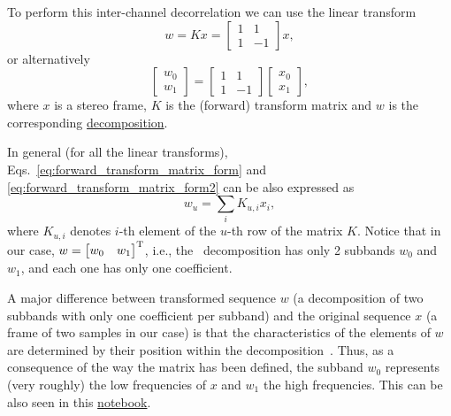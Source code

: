 To perform this inter-channel decorrelation we can use the linear transform
\begin{equation}
  w = Kx = \begin{bmatrix} 1 & 1 \\ 1 & -1 \end{bmatrix}x,
  \label{eq:forward_transform_matrix_form}
\end{equation}
or alternatively
\begin{equation}
  \begin{bmatrix}
    w_0 \\
    w_1
  \end{bmatrix}
  = 
  \begin{bmatrix} 1 & 1 \\ 1 & -1 \end{bmatrix}
  \begin{bmatrix}
    x_0 \\
    x_1
  \end{bmatrix},
  \label{eq:forward_transform_matrix_form2}
\end{equation}
where $x$ is a stereo frame, $K$ is the (forward) transform matrix and
$w$ is the
corresponding \href{https://en.wikipedia.org/wiki/Discrete_wavelet_transform#Example_in_image_processing}{decomposition}.


In general (for all the linear transforms), Eqs.~\ref{eq:forward_transform_matrix_form}
and \ref{eq:forward_transform_matrix_form2} can be also expressed as
\begin{equation}
  w_u = \sum_i K_{u,i}x_i,
  \label{eq:forward_transform_linear_combination_form}
\end{equation}
where $K_{u,i}$ denotes $i$-th element of the $u$-th row of the matrix
$K$. Notice that in our case, $w=\begin{bmatrix} w_0 &
w_1\end{bmatrix}^{\text T}$, i.e., the~ decomposition has only 2
subbands $w_0$ and $w_1$, and each one has only one coefficient.

A major difference between transformed sequence $w$ (a decomposition
of two subbands with only one coefficient per subband) and the
original sequence $x$ (a frame of two samples in our case) is that the
characteristics of the elements of $w$ are determined by their
position within the decomposition~\cite{sayood2017introduction}. Thus,
as a consequence of the way the matrix has been defined, the subband
$w_0$ represents (very roughly) the low frequencies of $x$ and $w_1$
the high frequencies. This can be also seen in this \href{}{notebook}.

